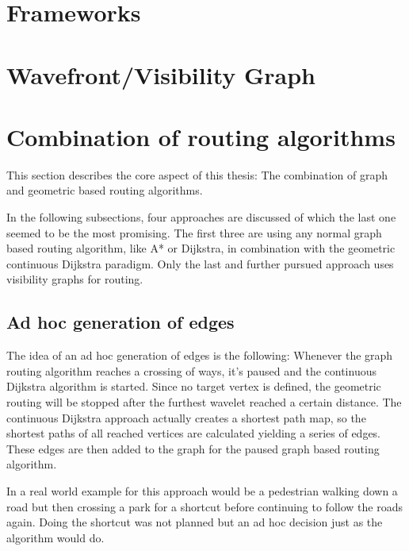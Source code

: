 
\section{Frameworks}


\section{Wavefront/Visibility Graph}


\section{Combination of routing algorithms}

	This section describes the core aspect of this thesis:
	The combination of graph and geometric based routing algorithms.
	
	In the following subsections, four approaches are discussed of which the last one seemed to be the most promising.
	The first three are using any normal graph based routing algorithm, like A* or Dijkstra, in combination with the geometric continuous Dijkstra paradigm.
	Only the last and further pursued approach uses visibility graphs for routing.

	\subsection{Ad hoc generation of edges}
	
		The idea of an ad hoc generation of edges is the following:
		Whenever the graph routing algorithm reaches a crossing of ways, it's paused and the continuous Dijkstra algorithm is started.
		Since no target vertex is defined, the geometric routing will be stopped after the furthest wavelet reached a certain distance.
		The continuous Dijkstra approach actually creates a shortest path map, so the shortest paths of all reached vertices are calculated yielding a series of edges.
		These edges are then added to the graph for the paused graph based routing algorithm.
		
		In a real world example for this approach would be a pedestrian walking down a road but then crossing a park for a shortcut before continuing to follow the roads again.
		Doing the shortcut was not planned but an ad hoc decision just as the algorithm would do.
		

